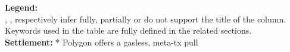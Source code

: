 \begin{table}[t!]
{\begin{tabular}{|l|c|c|c|c|c|c|c|c|c|c|}
\end{tabular}
}

\vspace{0.30em}
\begin{minipage}{\textwidth}
\textbf{Legend:} \\
\CIRCLE, \LEFTcircle, \Circle respectively infer fully, partially or do not support the title of the column.\\
Keywords used in the table are fully defined in the related sections.\\
\textbf{Settlement:} * Polygon offers a gasless, meta-tx pull  \\
\end{minipage}
\end{table} 